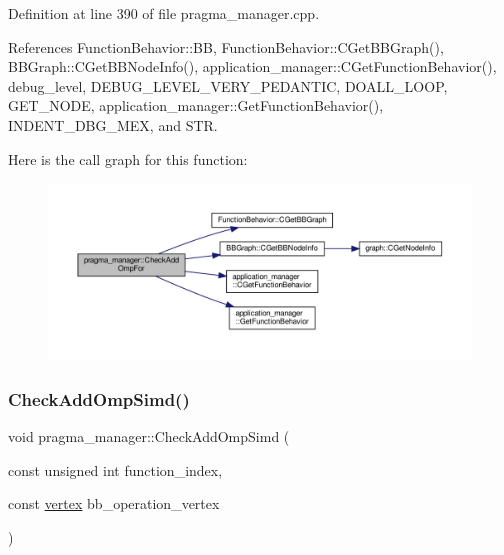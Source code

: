 Definition at line 390 of file pragma\+\_\+manager.\+cpp.



References Function\+Behavior\+::\+BB, Function\+Behavior\+::\+C\+Get\+B\+B\+Graph(), B\+B\+Graph\+::\+C\+Get\+B\+B\+Node\+Info(), application\+\_\+manager\+::\+C\+Get\+Function\+Behavior(), debug\+\_\+level, D\+E\+B\+U\+G\+\_\+\+L\+E\+V\+E\+L\+\_\+\+V\+E\+R\+Y\+\_\+\+P\+E\+D\+A\+N\+T\+IC, D\+O\+A\+L\+L\+\_\+\+L\+O\+OP, G\+E\+T\+\_\+\+N\+O\+DE, application\+\_\+manager\+::\+Get\+Function\+Behavior(), I\+N\+D\+E\+N\+T\+\_\+\+D\+B\+G\+\_\+\+M\+EX, and S\+TR.

Here is the call graph for this function\+:
\nopagebreak
\begin{figure}[H]
\begin{center}
\leavevmode
\includegraphics[width=350pt]{d2/d1d/classpragma__manager_a4d74b44eafacef0dd1b64d29f941e692_cgraph}
\end{center}
\end{figure}
\mbox{\label{classpragma__manager_ad95c048bc928e1a762807c74796a1fdc}} 
\subsubsection{\texorpdfstring{Check\+Add\+Omp\+Simd()}{CheckAddOmpSimd()}}
{\footnotesize\ttfamily void pragma\+\_\+manager\+::\+Check\+Add\+Omp\+Simd (\begin{DoxyParamCaption}\item[{const unsigned int}]{function\+\_\+index,  }\item[{const \hyperlink{graph_8hpp_abefdcf0544e601805af44eca032cca14}{vertex}}]{bb\+\_\+operation\+\_\+vertex }\end{DoxyParamCaption})}



